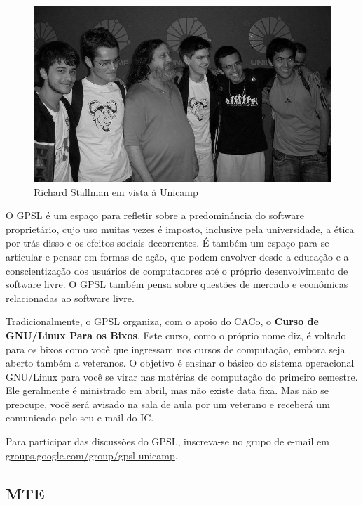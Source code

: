 \begin{figure}[h!]
    \centering
    \includegraphics[scale=0.36, keepaspectratio=true]{img/imgs/18-grupos_entidades/stallman2.JPG}
    \caption{Richard Stallman em vista à Unicamp}
\end{figure}

O GPSL é um espaço para refletir sobre a predominância do software proprietário,
cujo uso muitas vezes é imposto, inclusive pela universidade, a ética por trás
disso e os efeitos sociais decorrentes. É também um espaço para se articular e
pensar em formas de ação, que podem envolver desde a educação e a
conscientização dos usuários de computadores até o próprio desenvolvimento de
software livre. O GPSL também pensa sobre questões de mercado e econômicas
relacionadas ao software livre.

Tradicionalmente, o GPSL organiza, com o apoio do CACo, o \textbf{Curso de
GNU/Linux Para os Bixos}. Este curso, como o próprio nome diz, é voltado para os
bixos como você que ingressam nos cursos de computação, embora seja aberto
também a veteranos. O objetivo é ensinar o básico do sistema operacional
GNU/Linux para você se virar nas matérias de computação do primeiro semestre.
Ele geralmente é ministrado em abril, mas não existe data fixa. Mas não se
preocupe, você será avisado na sala de aula por um veterano e receberá um
comunicado pelo seu e-mail do IC.

Para participar das discussões do GPSL, inscreva-se no grupo de e-mail em
\url{groups.google.com/group/gpsl-unicamp}.

\subsection{MTE}

